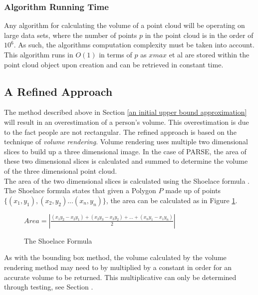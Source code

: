 \subsubsection{Algorithm Running Time}
Any algorithm for calculating the volume of a point cloud will be operating on large data sets, where the number of points $p$ in the point cloud is in the order of $10^6$.
As such, the algorithms computation complexity must be taken into account.\\

This algorithm runs in $O(1)$ in terms of $p$ as $xmax$ et al are stored within the point cloud object upon creation and can be retrieved in constant time. 

\subsection{A Refined Approach}
\label{design: a refined approach}
The method described above in Section \ref{an initial upper bound approximation} will result in an overestimation of a person's volume.
This overestimation is due to the fact people are not rectangular.
The refined approach is based on the technique of \textit{volume rendering}.
Volume rendering uses multiple two dimensional slices to build up a three dimensional image. 
In the case of PARSE, the area of these two dimensional slices is calculated and summed to determine the volume of the three dimensional point cloud.\\

The area of the two dimensional slices is calculated using the Shoelace formula \cite{Pretzsch2009}. 
The Shoelace formula states that given a Polygon $P$ made up of points $\{(x_1,y_1),(x_2,y_2)...(x_n,y_n)\}$, the area can be calculated as in Figure \ref{fig:the shoelace formula}.\\

\begin{figure}[h]
\begin{center}
$Area = \left|\frac{(x_1y_2 - x_2y_1) + (x_2y_3 - x_3y_2) + ... + (x_ny_1 - x_1y_n)}{2}\right|$
\end{center}
\caption{The Shoelace Formula \cite{Pretzsch2009}}
\label{fig:the shoelace formula}
\end{figure}

As with the bounding box method, the volume calculated by the volume rendering method may need to by multiplied by a constant in order for an accurate volume to be returned. 
This multiplicative can only be determined through testing, see Section .\\

